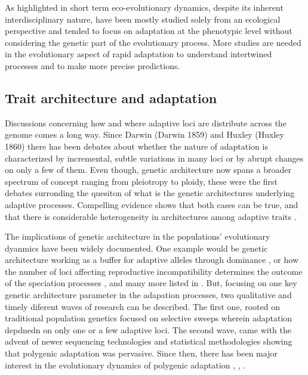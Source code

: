 \documentclass{article}
\begin{document}
As highlighted in \citep{Yamamichi2022-yj} short term eco-evolutionary dynamics, despite its inherent interdisciplinary nature, have been mostly studied solely from an ecological perspective and tended to focus on adaptation at the phenotypic level without considering the genetic part of the evolutionary process. More studies are needed in the evolutionary aspect of rapid adaptation to understand intertwined processes and to make more precise predictions.

\subsection{Trait architecture and adaptation}

Discussions concerning  how and where adaptive loci are distribute across the genome comes a long way. Since Darwin (Darwin 1859) and Huxley (Huxley 1860) there has been debates about whether the nature of adaptation is characterized by incremental, subtle variations in many loci or by abrupt changes on only a few of them. Even though, genetic architecture now spans a broader spectrum of concept ranging from pleiotropy to ploidy, these were the first debates surronding the quesiton  of what is the genetic architectures underlying adaptive processes. Compelling evidence shows that both cases can be true, and that there is considerable heterogeneity in architectures among adaptive traits \citep{Orr1992-xj, Orr1998-pr}. 

The implications of genetic architecture in the populations' evolutionary dyanmics have been widely documented. One example would be genetic architecture working as a buffer for adaptive alleles through dominance \citep{Yamamichi2017-uj}, or how the number of loci affecting reproductive incompatibility determines the outcome of the speciation processes \citep{Orr1996-eq}, and many more listed in \citep{Bertram2019-sg}. But, focusing on one key genetic architecture parameter in the adapation processes, two qualitative and timely diferent waves of research can be described. The first one, rooted on traditional population genetics focused on selective sweeps wherein adaptation depdnedn on only one or a few adaptive loci. The second wave, came with the advent of newer sequencing technologies and statistical methodologies showing that polygenic adaptation was pervasive. Since then, there has been major interest in the evolutionary dynamics of polygenic adaptation \citep{John2020-xc}  \citep{Jain2017-mb}, \citep{Barghi2020-aa} \citep{Hayward2021-ji, Stetter2018-st, Thornton2019-ww},  \citep{Hollinger2019-lb}. 
\end{document}
